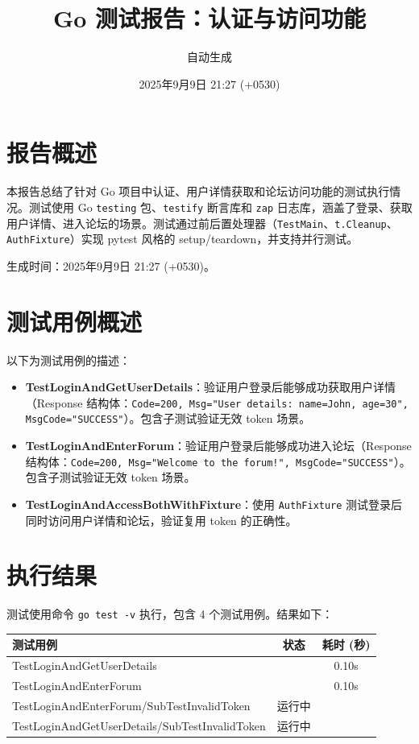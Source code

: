 \documentclass{article}
\title{Go 测试报告：认证与访问功能}
\author{自动生成}
\date{2025年9月9日 21:27 (+0530)}
\begin{document}
\maketitle

\section{报告概述}
本报告总结了针对 Go 项目中认证、用户详情获取和论坛访问功能的测试执行情况。测试使用 Go \texttt{testing} 包、\texttt{testify} 断言库和 \texttt{zap} 日志库，涵盖了登录、获取用户详情、进入论坛的场景。测试通过前后置处理器（\texttt{TestMain}、\texttt{t.Cleanup}、\texttt{AuthFixture}）实现 pytest 风格的 setup/teardown，并支持并行测试。

生成时间：2025年9月9日 21:27 (+0530)。

\section{测试用例概述}
以下为测试用例的描述：
\begin{itemize}
    \item \textbf{TestLoginAndGetUserDetails}：验证用户登录后能够成功获取用户详情（Response 结构体：\texttt{Code=200, Msg="User details: name=John, age=30", MsgCode="SUCCESS"}）。包含子测试验证无效 token 场景。
    \item \textbf{TestLoginAndEnterForum}：验证用户登录后能够成功进入论坛（Response 结构体：\texttt{Code=200, Msg="Welcome to the forum!", MsgCode="SUCCESS"}）。包含子测试验证无效 token 场景。
    \item \textbf{TestLoginAndAccessBothWithFixture}：使用 \texttt{AuthFixture} 测试登录后同时访问用户详情和论坛，验证复用 token 的正确性。
\end{itemize}

\section{执行结果}
测试使用命令 \texttt{go test -v} 执行，包含 4 个测试用例。结果如下：
\begin{longtable}{|l|c|c|}
    \hline
    \textbf{测试用例} & \textbf{状态} & \textbf{耗时 (秒)} \\
    \hline
    TestLoginAndGetUserDetails &  & 0.10s \\ \hline
    TestLoginAndEnterForum &  & 0.10s \\ \hline
    TestLoginAndEnterForum/SubTestInvalidToken & 运行中 &  \\ \hline
    TestLoginAndGetUserDetails/SubTestInvalidToken & 运行中 &  \\ \hline
\end{longtable}
\end{document}

